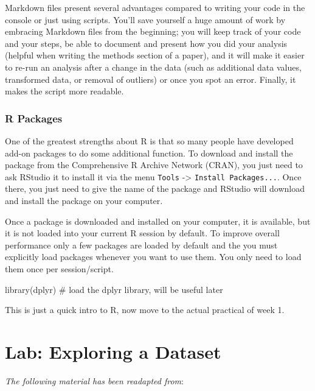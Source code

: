 \documentclass[
  letterpaper,
  DIV=11,
  numbers=noendperiod]{scrreprt}
\newenvironment{Shaded}{\begin{snugshade}}{\end{snugshade}}
\newcommand{\CommentTok}[1]{\textcolor[rgb]{0.37,0.37,0.37}{#1}}
\newcommand{\FunctionTok}[1]{\textcolor[rgb]{0.28,0.35,0.67}{#1}}
\newcommand{\NormalTok}[1]{\textcolor[rgb]{0.00,0.23,0.31}{#1}}
\begin{document}
Markdown files present several advantages compared to writing your code
in the console or just using scripts. You'll save yourself a huge amount
of work by embracing Markdown files from the beginning; you will keep
track of your code and your steps, be able to document and present how
you did your analysis (helpful when writing the methods section of a
paper), and it will make it easier to re-run an analysis after a change
in the data (such as additional data values, transformed data, or
removal of outliers) or once you spot an error. Finally, it makes the
script more readable.

\subsection{R Packages}\label{r-packages}

One of the greatest strengths about R is that so many people have
developed add-on packages to do some additional function. To download
and install the package from the Comprehensive R Archive Network (CRAN),
you just need to ask RStudio it to install it via the menu
\texttt{Tools} -\textgreater{} \texttt{Install\ Packages...}. Once
there, you just need to give the name of the package and RStudio will
download and install the package on your computer.

Once a package is downloaded and installed on your computer, it is
available, but it is not loaded into your current R session by default.
To improve overall performance only a few packages are loaded by default
and the you must explicitly load packages whenever you want to use them.
You only need to load them once per session/script.

\begin{Shaded}
\begin{Highlighting}[]
\FunctionTok{library}\NormalTok{(dplyr)   }\CommentTok{\# load the dplyr library, will be useful later}
\end{Highlighting}
\end{Shaded}

This is just a quick intro to R, now move to the actual practical of
week 1.


\chapter{Lab: Exploring a Dataset}\label{lab-exploring-a-dataset}

\emph{The following material has been readapted from}:
\end{document}
